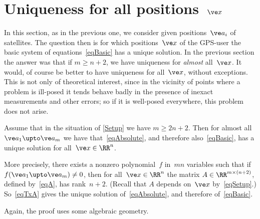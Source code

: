 \documentclass[reqno]{amsart}
\begin{document}
\section{Uniqueness for all positions~$\ve x$} \label{sAllX}

In this section, as in the previous one, we consider given
positions~$\ve a_i$ of satellites. The question then is for which positions~$\ve x$ of the
GPS-user the basic system of
equations~\eqref{eqBasic} has a unique solution. In the previous
section the answer was that if $m \ge n+2$, we have uniqueness for
{\em almost} all~$\ve x$. It would, of course be better to have
uniqueness for all~$\ve x$, without exceptions. This is not only of theoretical interest, since in the
vicinity of points where a problem is ill-posed it tends behave badly
in the presence of inexact measurements and other errors; so if it is
well-posed everywhere, this problem does not arise.


\begin{theorem} \label{tM8}%
  Assume that in the situation of \cref{Setup} we have
  $m \ge 2 n + 2$. Then for almost all~$\ve a_1 \upto \ve a_m$ we have
  that~\eqref{eqAbsolute}, and therefore also~\eqref{eqBasic}, has a
  unique solution for all~$\ve x \in \RR^n$.

  More precisely, there exists a nonzero polynomial~$f$ in~$m n$
  variables such that if $f(\ve a_1 \upto \ve a_m) \ne 0$, then for
  all~$\ve x \in \RR^n$ the matrix $A \in \RR^{m \times (n + 2)}$,
  defined by~\eqref{eqA}, has rank~$n + 2$. (Recall that $A$ depends
  on~$\ve x$ by~\eqref{eqSetup}.) So~\eqref{eqTxA} gives the unique
  solution of~\eqref{eqAbsolute}, and therefore of~\eqref{eqBasic}.
\end{theorem}

Again, the proof uses some algebraic geometry.
\end{document}
